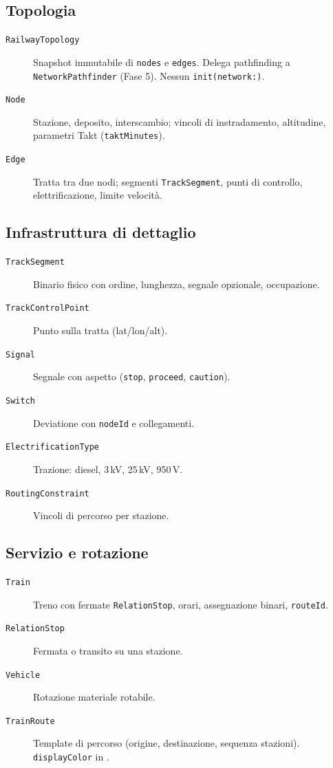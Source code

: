 \subsection{Topologia}

\begin{description}
  \item[\texttt{RailwayTopology}] Snapshot immutabile di \texttt{nodes}
    e \texttt{edges}. Delega pathfinding a \texttt{NetworkPathfinder}
    (Fase 5). Nessun \texttt{init(network:)}.
  \item[\texttt{Node}] Stazione, deposito, interscambio; vincoli di
    instradamento, altitudine, parametri Takt (\texttt{taktMinutes}).
  \item[\texttt{Edge}] Tratta tra due nodi; segmenti \texttt{TrackSegment},
    punti di controllo, elettrificazione, limite velocità.
\end{description}

\subsection{Infrastruttura di dettaglio}

\begin{description}
  \item[\texttt{TrackSegment}] Binario fisico con ordine, lunghezza,
    segnale opzionale, occupazione.
  \item[\texttt{TrackControlPoint}] Punto sulla tratta (lat/lon/alt).
  \item[\texttt{Signal}] Segnale con aspetto (\texttt{stop}, \texttt{proceed},
    \texttt{caution}).
  \item[\texttt{Switch}] Deviatione con \texttt{nodeId} e collegamenti.
  \item[\texttt{ElectrificationType}] Trazione: diesel, 3\,kV, 25\,kV, 950\,V.
  \item[\texttt{RoutingConstraint}] Vincoli di percorso per stazione.
\end{description}

\subsection{Servizio e rotazione}

\begin{description}
  \item[\texttt{Train}] Treno con fermate \texttt{RelationStop}, orari,
    assegnazione binari, \texttt{routeId}.
  \item[\texttt{RelationStop}] Fermata o transito su una stazione.
  \item[\texttt{Vehicle}] Rotazione materiale rotabile.
  \item[\texttt{TrainRoute}] Template di percorso (origine, destinazione,
    sequenza stazioni). \texttt{displayColor} in .
\end{description}

